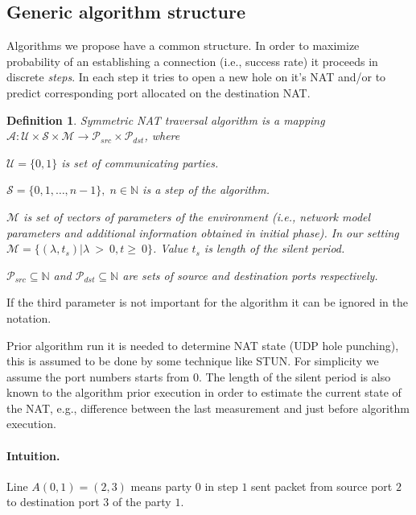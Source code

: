 \documentclass[twoside]{article}
\newtheorem{mydef}{Definition}
\begin{document}
\begin{multicols}{2}
\section{Generic algorithm structure}
Algorithms we propose have a common structure. In order to maximize probability of an establishing
a connection (i.e., success rate) it proceeds in discrete \emph{steps}. In each step it 
tries to open a new hole on it's NAT and/or to predict corresponding port allocated on the destination
NAT.

\begin{mydef}
Symmetric NAT traversal algorithm is a mapping 
$\mathcal{A}: \mathcal{U} \times \mathcal{S} \times \mathcal{M} \rightarrow \mathcal{P}_{src} \times \mathcal{P}_{dst}$, 
where \\
\begin{compactitem}
\item $\mathcal{U}=\{0,1\}$ is set of communicating parties.
\item $\mathcal{S} = \{0, 1, \dots, n-1\}, \; n \in \mathbb{N}$ is a step of the algorithm.
\item $\mathcal{M}$ is set of vectors of parameters of the environment (i.e., network model 
parameters and additional information obtained in initial phase). 
In our setting $\mathcal{M} = \{ (\lambda, t_s) | \lambda~>~0, t\geq~0 \}$. Value $t_s$ is length of the silent period. %
\item $\mathcal{P}_{src} \subseteq \mathbb{N}$ and $\mathcal{P}_{dst} \subseteq \mathbb{N}$
are sets of source and destination ports respectively.
\end{compactitem}
\end{mydef}
If the third parameter is not important for the algorithm it can be ignored in the notation. 

Prior algorithm run it is needed to 
determine NAT state (UDP hole punching), this is assumed to be done by some technique like STUN. For simplicity we assume the port numbers
starts from $0$. The length of the silent period is also known to the algorithm prior execution in order to estimate the current state of 
the NAT, e.g., difference between the last measurement and just before algorithm execution.

\paragraph{Intuition.} 
Line $A(0,1) = (2,3)$ means party $0$ in step $1$ sent packet from source port $2$ to destination port $3$
of the party $1$.


\end{multicols}
\end{document}
